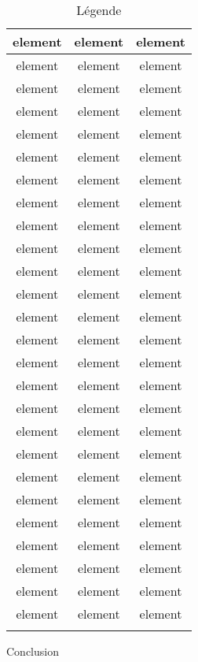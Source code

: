 \documentclass{zmdocument}
\begin{document}
\begin{longtabu}{|c|c|c|} \hline
element & element & element\\ \hline
element & element & element\\ \hline
element & element & element\\ \hline
element & element & element\\ \hline
element & element & element\\ \hline
element & element & element\\ \hline
element & element & element\\ \hline
element & element & element\\ \hline
element & element & element\\ \hline
element & element & element\\ \hline
element & element & element\\ \hline
element & element & element\\ \hline
element & element & element\\ \hline
element & element & element\\ \hline
element & element & element\\ \hline
element & element & element\\ \hline
element & element & element\\ \hline
element & element & element\\ \hline
element & element & element\\ \hline
element & element & element\\ \hline
element & element & element\\ \hline
element & element & element\\ \hline
element & element & element\\ \hline
element & element & element\\ \hline
element & element & element\\ \hline
element & element & element\\ \hline
\caption{Légende}
\end{longtabu}

Conclusion
\end{document}
